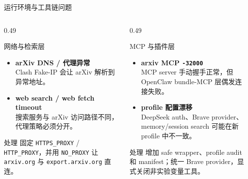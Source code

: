 \documentclass[UTF8,fontset=fandol,aspectratio=169]{ctexbeamer}
\begin{document}
\begin{frame}{运行环境与工具链问题}
  \small
  \begin{columns}[T,onlytextwidth]
    \begin{column}{0.49\textwidth}
      \begin{alertblock}{网络与检索层}
        \begin{itemize}
          \setlength{\itemsep}{2pt}
          \item \textbf{arXiv DNS / 代理异常}\\
          Clash Fake-IP 会让 arXiv 解析到异常地址。
          \item \textbf{web search / web fetch timeout}\\
          搜索服务与 arXiv 访问路径不同，代理策略必须分开。
        \end{itemize}
      \end{alertblock}

      \begin{block}{处理}
        固定 \texttt{HTTPS\_PROXY} / \texttt{HTTP\_PROXY}，并用 \texttt{NO\_PROXY} 让 \texttt{arxiv.org} 与 \texttt{export.arxiv.org} 直连。
      \end{block}
    \end{column}

    \begin{column}{0.49\textwidth}
      \begin{alertblock}{MCP 与插件层}
        \begin{itemize}
          \setlength{\itemsep}{2pt}
          \item \textbf{arxiv MCP \texttt{-32000}}\\
          MCP server 手动握手正常，但 OpenClaw bundle-MCP 层偶发连接失败。
          \item \textbf{profile 配置漂移}\\
          DeepSeek auth、Brave provider、memory/session search 可能在新 profile 中不一致。
        \end{itemize}
      \end{alertblock}

      \begin{block}{处理}
        增加 safe wrapper、profile audit 和 manifest；统一 Brave provider，显式关闭非实验变量工具。
      \end{block}
    \end{column}
  \end{columns}
\end{frame}
\end{document}
